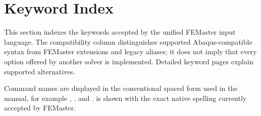 \section{Keyword Index}
\label{sec:keyword-index}

This section indexes the keywords accepted by the unified FEMaster
input language. The compatibility column distinguishes supported
Abaqus-compatible syntax from FEMaster extensions and legacy aliases;
it does not imply that every option offered by another solver is
implemented. Detailed keyword pages explain supported alternatives.

Command names are displayed in the conventional spaced form used in the manual, for example , , and .  is shown with the exact native spelling currently accepted by FEMaster.

